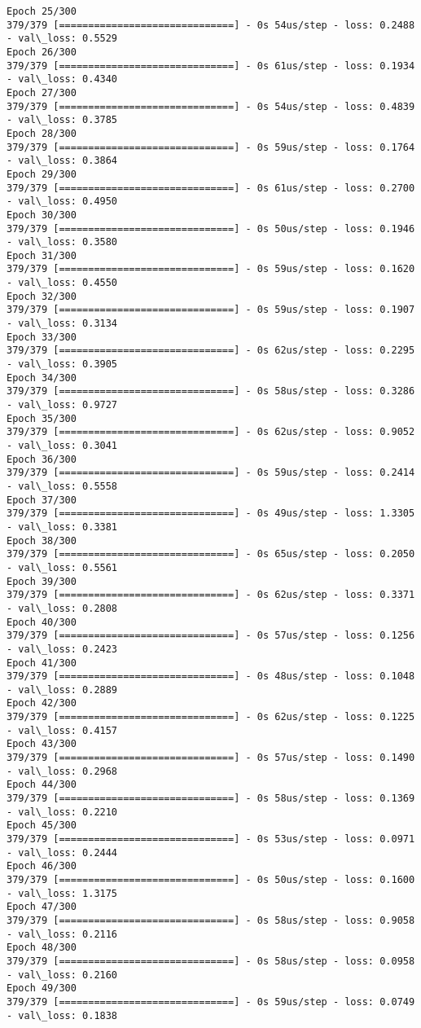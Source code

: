 \documentclass[11pt]{article}
\begin{document}
\begin{Verbatim}[commandchars=\\\{\}]
Epoch 25/300
379/379 [==============================] - 0s 54us/step - loss: 0.2488 - val\_loss: 0.5529
Epoch 26/300
379/379 [==============================] - 0s 61us/step - loss: 0.1934 - val\_loss: 0.4340
Epoch 27/300
379/379 [==============================] - 0s 54us/step - loss: 0.4839 - val\_loss: 0.3785
Epoch 28/300
379/379 [==============================] - 0s 59us/step - loss: 0.1764 - val\_loss: 0.3864
Epoch 29/300
379/379 [==============================] - 0s 61us/step - loss: 0.2700 - val\_loss: 0.4950
Epoch 30/300
379/379 [==============================] - 0s 50us/step - loss: 0.1946 - val\_loss: 0.3580
Epoch 31/300
379/379 [==============================] - 0s 59us/step - loss: 0.1620 - val\_loss: 0.4550
Epoch 32/300
379/379 [==============================] - 0s 59us/step - loss: 0.1907 - val\_loss: 0.3134
Epoch 33/300
379/379 [==============================] - 0s 62us/step - loss: 0.2295 - val\_loss: 0.3905
Epoch 34/300
379/379 [==============================] - 0s 58us/step - loss: 0.3286 - val\_loss: 0.9727
Epoch 35/300
379/379 [==============================] - 0s 62us/step - loss: 0.9052 - val\_loss: 0.3041
Epoch 36/300
379/379 [==============================] - 0s 59us/step - loss: 0.2414 - val\_loss: 0.5558
Epoch 37/300
379/379 [==============================] - 0s 49us/step - loss: 1.3305 - val\_loss: 0.3381
Epoch 38/300
379/379 [==============================] - 0s 65us/step - loss: 0.2050 - val\_loss: 0.5561
Epoch 39/300
379/379 [==============================] - 0s 62us/step - loss: 0.3371 - val\_loss: 0.2808
Epoch 40/300
379/379 [==============================] - 0s 57us/step - loss: 0.1256 - val\_loss: 0.2423
Epoch 41/300
379/379 [==============================] - 0s 48us/step - loss: 0.1048 - val\_loss: 0.2889
Epoch 42/300
379/379 [==============================] - 0s 62us/step - loss: 0.1225 - val\_loss: 0.4157
Epoch 43/300
379/379 [==============================] - 0s 57us/step - loss: 0.1490 - val\_loss: 0.2968
Epoch 44/300
379/379 [==============================] - 0s 58us/step - loss: 0.1369 - val\_loss: 0.2210
Epoch 45/300
379/379 [==============================] - 0s 53us/step - loss: 0.0971 - val\_loss: 0.2444
Epoch 46/300
379/379 [==============================] - 0s 50us/step - loss: 0.1600 - val\_loss: 1.3175
Epoch 47/300
379/379 [==============================] - 0s 58us/step - loss: 0.9058 - val\_loss: 0.2116
Epoch 48/300
379/379 [==============================] - 0s 58us/step - loss: 0.0958 - val\_loss: 0.2160
Epoch 49/300
379/379 [==============================] - 0s 59us/step - loss: 0.0749 - val\_loss: 0.1838

\end{Verbatim}
\end{document}
